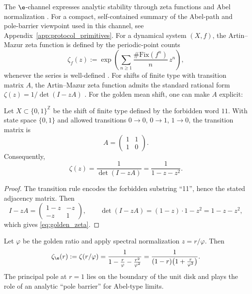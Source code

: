 The $\e$-channel expresses analytic stability through zeta functions and Abel normalization \cite{ArtinMazur1965,ParryPollicott1990,Ruelle1978}.
For a compact, self-contained summary of the Abel-path and pole-barrier viewpoint used in this channel, see Appendix~\ref{app:protocol_primitives}.
For a dynamical system $(X,f)$, the Artin--Mazur zeta function is defined by the periodic-point counts
\begin{equation}\label{eq:artin_mazur_def}
\zeta_f(z):=\exp\!\left(\sum_{n\ge 1}\frac{\#\mathrm{Fix}(f^n)}{n}\,z^n\right),
\end{equation}
whenever the series is well-defined \cite{ArtinMazur1965,ParryPollicott1990}.
For shifts of finite type with transition matrix $A$, the Artin--Mazur zeta function admits the standard rational form $\zeta(z)=1/\det(I-zA)$ \cite{ParryPollicott1990,LindMarcus1995,Ruelle1978}.
For the golden mean shift, one can make $A$ explicit:
\begin{lemma}\label{lem:golden_zeta_matrix}
Let $X\subset\{0,1\}^{\mathbb{Z}}$ be the shift of finite type defined by the forbidden word $11$.
With state space $\{0,1\}$ and allowed transitions $0\to 0$, $0\to 1$, $1\to 0$, the transition matrix is
\[
A=\begin{pmatrix}
1 & 1\\
1 & 0
\end{pmatrix}.
\]
Consequently,
\begin{equation}\label{eq:golden_zeta}
\zeta(z)=\frac{1}{\det(I-zA)}=\frac{1}{1-z-z^2}.
\end{equation}
\end{lemma}
\begin{proof}
The transition rule encodes the forbidden substring ``11'', hence the stated adjacency matrix.
Then
\[
I-zA=
\begin{pmatrix}
1-z & -z\\
-z & 1
\end{pmatrix},
\qquad
\det(I-zA)=(1-z)\cdot 1 - z^2=1-z-z^2,
\]
which gives \eqref{eq:golden_zeta}.
\end{proof}
Let $\varphi$ be the golden ratio and apply spectral normalization $z=r/\varphi$.
Then
\begin{equation}\label{eq:abel_normalized_zeta}
\zeta_\e(r):=\zeta(r/\varphi)=\frac{1}{1-\frac{r}{\varphi}-\frac{r^2}{\varphi^2}}
=\frac{1}{(1-r)\bigl(1+\frac{r}{\varphi^2}\bigr)}.
\end{equation}
The principal pole at $r=1$ lies on the boundary of the unit disk and plays the role of an analytic ``pole barrier'' for Abel-type limits.

